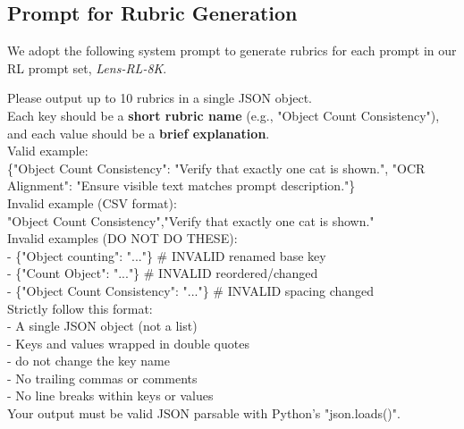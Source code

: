 \documentclass{llmxive}
\begin{document}
\subsection{Prompt for Rubric Generation}
\label{sec:prompt-rubric}

We adopt the following system prompt to generate rubrics for each prompt in our RL prompt set, \textit{Lens-RL-8K}.

\begin{tcolorbox}[
  breakable,
  enhanced,
  colback=white,
  colframe=black!70,
  boxrule=0.8pt,
  arc=2pt,
  title={Prompt for Rubric Generation},
  colbacktitle=black!75,
  coltitle=white,
  fonttitle=\bfseries,
  left=8pt,right=8pt,top=8pt,bottom=8pt
]
\footnotesize
Please output up to 10 rubrics in a single JSON object.\\
Each key should be a \textbf{short rubric name} (e.g., "Object Count Consistency"), and each value should be a \textbf{brief explanation}.\\
Valid example:\\
\{"Object Count Consistency": "Verify that exactly one cat is shown.", "OCR Alignment": "Ensure visible text matches prompt description."\}\\
Invalid example (CSV format):\\
"Object Count Consistency","Verify that exactly one cat is shown."\\
Invalid examples (DO NOT DO THESE):\\
- \{"Object counting": "..."\} \hspace{1em} \# INVALID renamed base key\\
- \{"Count Object": "..."\} \hspace{1em} \# INVALID reordered/changed\\
- \{"Object  Count  Consistency": "..."\} \# INVALID spacing changed\\
Strictly follow this format:\\
- A single JSON object (not a list)\\
- Keys and values wrapped in double quotes\\
- do not change the key name\\
- No trailing commas or comments\\
- No line breaks within keys or values\\
Your output must be valid JSON parsable with Python's "json.loads()".
\end{tcolorbox}
\end{document}
